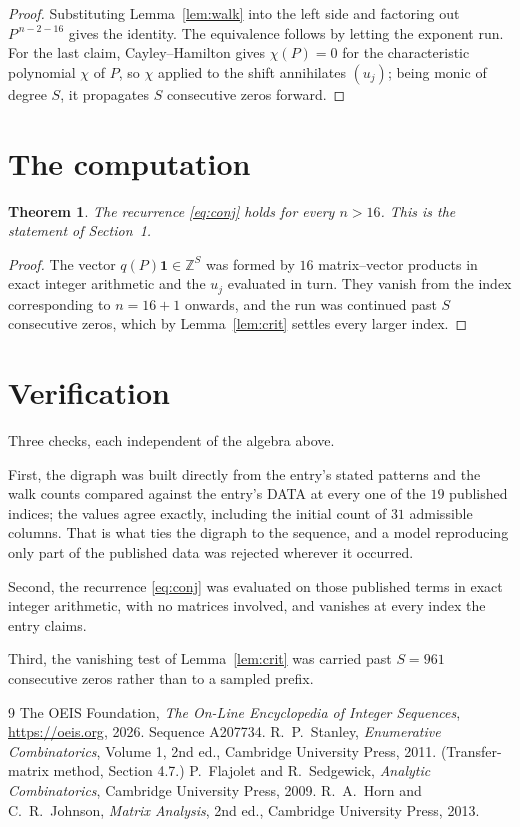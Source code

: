 \documentclass[11pt,a4paper]{article}
\theoremstyle{plain}
\newtheorem{theorem}{Theorem}
\theoremstyle{definition}
\begin{document}
\begin{proof}
Substituting Lemma~\ref{lem:walk} into the left side and factoring out
$P^{\,n-2-16}$ gives the identity. The equivalence follows by letting the exponent
run. For the last claim, Cayley--Hamilton gives $\chi(P)=0$ for the characteristic
polynomial $\chi$ of $P$, so $\chi$ applied to the shift annihilates $(u_j)$; being monic of
degree $S$, it propagates $S$ consecutive zeros forward.
\end{proof}

\section{The computation}

\begin{theorem}
The recurrence \eqref{eq:conj} holds for every $n>16$. This is the statement of
Section~1.
\end{theorem}

\begin{proof}
The vector $q(P)\mathbf{1}\in\mathbb{Z}^{S}$ was formed by $16$ matrix--vector
products in exact integer arithmetic and the $u_j$ evaluated in turn. They vanish from the
index corresponding to $n=16+1$ onwards, and the run was continued past $S$ consecutive
zeros, which by Lemma~\ref{lem:crit} settles every larger index.
\end{proof}

\section{Verification}

Three checks, each independent of the algebra above.

First, the digraph was built directly from the entry's stated patterns and the walk counts
compared against the entry's DATA at every one of the $19$ published indices; the
values agree exactly, including the initial count of $31$ admissible columns. That is
what ties the digraph to the sequence, and a model reproducing only part of the published
data was rejected wherever it occurred.

Second, the recurrence \eqref{eq:conj} was evaluated on those published terms in exact
integer arithmetic, with no matrices involved, and vanishes at every index the entry claims.

Third, the vanishing test of Lemma~\ref{lem:crit} was carried past $S=961$ consecutive
zeros rather than to a sampled prefix.

\begin{thebibliography}{9}
 The OEIS Foundation, \emph{The On-Line Encyclopedia of Integer
Sequences}, \url{https://oeis.org}, 2026. Sequence A207734.
 R.~P.~Stanley, \emph{Enumerative Combinatorics}, Volume 1, 2nd ed.,
Cambridge University Press, 2011. (Transfer-matrix method, Section 4.7.)
 P.~Flajolet and R.~Sedgewick, \emph{Analytic Combinatorics}, Cambridge
University Press, 2009.
 R.~A.~Horn and C.~R.~Johnson, \emph{Matrix Analysis}, 2nd ed., Cambridge
University Press, 2013.
\end{thebibliography}
\end{document}
